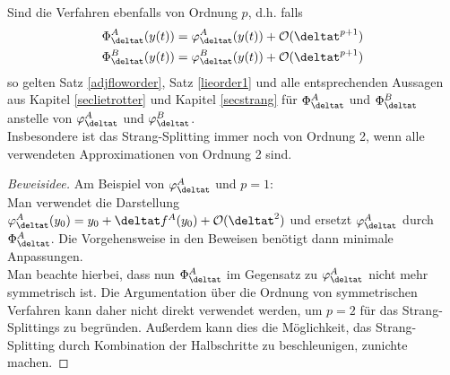 \begin{maththeorem}
Sind die Verfahren ebenfalls von Ordnung $p$, d.h. falls 
\begin{align*}
\Phi_{\deltat}^A(y(t))=\varphi_{\deltat}^A(y(t))+\mathcal{O}(\deltat^{p+1})\\
\Phi_{\deltat}^B(y(t))=\varphi_{\deltat}^B(y(t))+\mathcal{O}(\deltat^{p+1})
\end{align*}
so gelten Satz \ref{adjfloworder}, Satz \ref{lieorder1} und alle entsprechenden Aussagen aus Kapitel \ref{seclietrotter} und Kapitel \ref{secstrang} für $\Phi_{\deltat}^A$ und $\Phi_{\deltat}^B$ anstelle von $\varphi_{\deltat}^A$ und $\varphi_{\deltat}^B$.\\
Insbesondere ist das Strang-Splitting immer noch von Ordnung 2, wenn alle verwendeten Approximationen von Ordnung 2 sind.
\end{maththeorem}
\begin{proof}[Beweisidee]
Am Beispiel von $\varphi_{\deltat}^A$ und $p=1$:\\
Man verwendet die Darstellung $\varphi_{\deltat}^A(y_0)=y_0+\deltat f^A(y_0)+\mathcal{O}(\deltat^2)$ und ersetzt $\varphi_{\deltat}^A$ durch $\Phi_{\deltat}^A$. Die Vorgehensweise in den Beweisen benötigt dann minimale Anpassungen.\\
Man beachte hierbei, dass nun $\Phi_{\deltat}^A$ im Gegensatz zu $\varphi_{\deltat}^A$ nicht mehr symmetrisch ist. Die Argumentation über die Ordnung von symmetrischen Verfahren kann daher nicht direkt verwendet werden, um $p=2$ für das Strang-Splittings zu begründen. Außerdem kann dies die Möglichkeit, das Strang-Splitting durch Kombination der Halbschritte zu beschleunigen, zunichte machen.
\end{proof}

